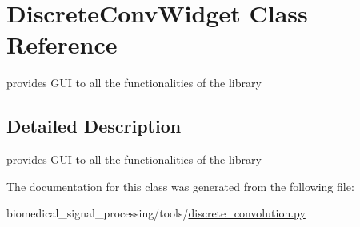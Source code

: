 \hypertarget{classDiscreteConvWidget}{}\section{Discrete\+Conv\+Widget Class Reference}
\label{classDiscreteConvWidget}


provides G\+UI to all the functionalities of the library  




\subsection{Detailed Description}
provides G\+UI to all the functionalities of the library 

The documentation for this class was generated from the following file\+:\begin{DoxyCompactItemize}
\item 
biomedical\+\_\+signal\+\_\+processing/tools/\hyperlink{discrete__convolution_8py}{discrete\+\_\+convolution.\+py}\end{DoxyCompactItemize}
